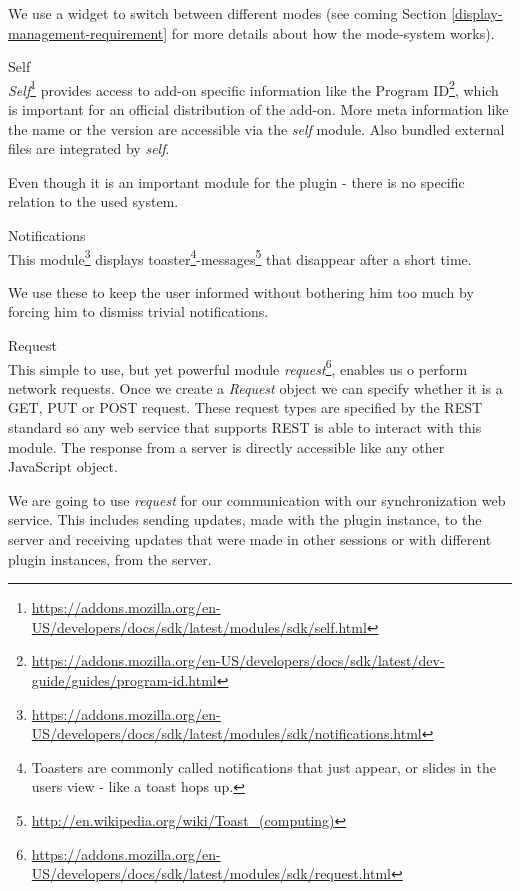 \begin{description}
We use a widget to switch between different modes (see coming Section \ref{display-management-requirement} for more details about how the mode-system works).

\item Self\\
\emph{Self}\footnote{\url{https://addons.mozilla.org/en-US/developers/docs/sdk/latest/modules/sdk/self.html}} provides access to add-on specific information like the Program ID\footnote{\url{https://addons.mozilla.org/en-US/developers/docs/sdk/latest/dev-guide/guides/program-id.html}}, which is important for an official distribution of the add-on. More meta information like the name or the version are accessible via the \emph{self} module. Also bundled external files are integrated by \emph{self}.

Even though it is an important module for the plugin - there is no specific relation to the used system. 

\item Notifications\\
This module\footnote{\url{https://addons.mozilla.org/en-US/developers/docs/sdk/latest/modules/sdk/notifications.html}} displays toaster\footnote{Toasters are commonly called notifications that just appear, or slides in the users view - like a toast hops up.}-messages\footnote{\url{http://en.wikipedia.org/wiki/Toast_(computing)}} that disappear after a short time.

We use these to keep the user informed without bothering him too much by forcing him to dismiss trivial notifications.

\item Request\\
This simple to use, but yet powerful module \emph{request}\footnote{\url{https://addons.mozilla.org/en-US/developers/docs/sdk/latest/modules/sdk/request.html}}, enables us o perform network requests. Once we create a \emph{Request} object we can specify whether it is a GET, PUT or POST request. These request types are specified by the REST standard so any web service that supports REST is able to interact with this module\cite{fielding2000principled}. The response from a server is directly accessible like any other JavaScript object. 

We are going to use \emph{request} for our communication with our synchronization web service. This includes sending updates, made with the plugin instance, to the server and receiving updates that were made in other sessions or with different plugin instances, from the server. 

\end{description}

